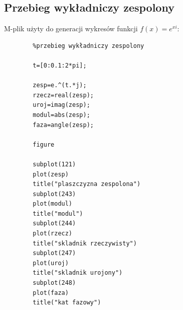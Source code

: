 \documentclass[12pt,titlepage]{report}
\begin{document}
\subsection{Przebieg wykładniczy zespolony}
M-plik użyty do generacji wykresów funkcji $f\left(x\right)={e}^{xi}$:
\begin{multicols}{3}
	{
		\tiny
		\begin{verbatim}
		%przebieg wykładniczy zespolony
		
		t=[0:0.1:2*pi];
		
		zesp=e.^(t.*j);
		rzecz=real(zesp);
		uroj=imag(zesp);
		modul=abs(zesp);
		faza=angle(zesp);
		
		figure
		
		subplot(121)
		plot(zesp)
		title("plaszczyzna zespolona")
		subplot(243)
		plot(modul)
		title("modul")
		subplot(244)
		plot(rzecz)
		title("skladnik rzeczywisty")
		subplot(247)
		plot(uroj)
		title("skladnik urojony")
		subplot(248)
		plot(faza)
		title("kat fazowy")
		\end{verbatim}
	}
\end{multicols}
\end{document}
